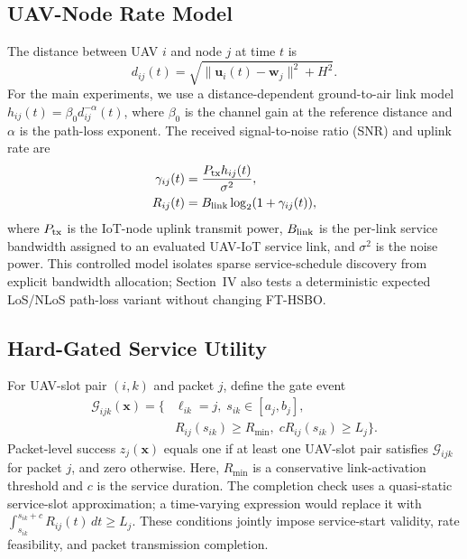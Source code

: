 \documentclass[letterpaper,journal]{IEEEtran}
\begin{document}
\subsection{UAV-Node Rate Model}
The distance between UAV $i$ and node $j$ at time $t$ is
\begin{equation}
d_{ij}(t)=\sqrt{\|\mathbf{u}_i(t)-\mathbf{w}_j\|^2+H^2}.
\end{equation}
For the main experiments, we use a distance-dependent ground-to-air link model $h_{ij}(t)=\beta_0 d_{ij}^{-\alpha}(t)$, where $\beta_0$ is the channel gain at the reference distance and $\alpha$ is the path-loss exponent. The received signal-to-noise ratio (SNR) and uplink rate are
\begin{align}
\gamma_{ij}(t) &= \frac{P_{\rm tx}h_{ij}(t)}{\sigma^2},\\
R_{ij}(t) &= B_{\rm link}\log_2(1+\gamma_{ij}(t)),
\end{align}
where $P_{\rm tx}$ is the IoT-node uplink transmit power, $B_{\rm link}$ is the per-link service bandwidth assigned to an evaluated UAV-IoT service link, and $\sigma^2$ is the noise power. This controlled model isolates sparse service-schedule discovery from explicit bandwidth allocation; Section~IV also tests a deterministic expected LoS/NLoS path-loss variant without changing FT-HSBO.

\subsection{Hard-Gated Service Utility}
For UAV-slot pair $(i,k)$ and packet $j$, define the gate event
\begin{equation}
\label{eq:gates}
\begin{aligned}
\mathcal{G}_{ijk}(\mathbf{x})=\{&
\ell_{ik}=j,\; s_{ik}\in[a_j,b_j],\\
&R_{ij}(s_{ik})\ge R_{\min},\;
cR_{ij}(s_{ik})\ge L_j\}.
\end{aligned}
\end{equation}
Packet-level success $z_j(\mathbf{x})$ equals one if at least one UAV-slot pair satisfies $\mathcal{G}_{ijk}$ for packet $j$, and zero otherwise. Here, $R_{\min}$ is a conservative link-activation threshold and $c$ is the service duration. The completion check uses a quasi-static service-slot approximation; a time-varying expression would replace it with $\int_{s_{ik}}^{s_{ik}+c}R_{ij}(t)\,dt\ge L_j$. These conditions jointly impose service-start validity, rate feasibility, and packet transmission completion.
\end{document}
